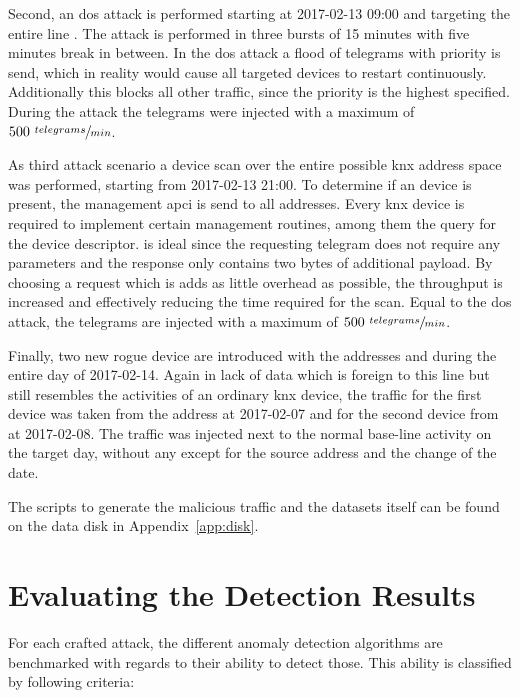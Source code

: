 Second, an \gls{dos} attack is performed starting at 2017-02-13 09:00 and targeting the entire line . The attack is performed in three bursts of 15 minutes with five minutes break in between. In the \gls{dos} attack a flood of  telegrams with  priority is send, which in reality would cause all targeted devices to restart continuously. Additionally this blocks all other traffic, since the  priority is the highest specified. During the attack the telegrams were injected with a maximum of \(500 \ \sfrac{telegrams}{min}\).

As third attack scenario a device scan over the entire possible \gls{knx} address space was performed, starting from 2017-02-13 21:00.
To determine if an device is present, the management \gls{apci}\break{} is send to all addresses. Every \gls{knx} device is required to implement certain management routines, among them the query for the device descriptor.  is ideal since the requesting telegram does not require any parameters and the response only contains two bytes of additional payload. By choosing a request which is adds as little overhead as possible, the throughput is increased and effectively reducing the time required for the scan. \parencite[cf.][p.~46]{DIN_EN_50090-4-1}
Equal to the \gls{dos} attack, the telegrams are injected with a maximum of \(500 \ \sfrac{telegrams}{min}\).

Finally, two new rogue device are introduced with the addresses  and  during the entire day of 2017-02-14.
Again in lack of data which is foreign to this line but still resembles the activities of an ordinary \gls{knx} device, the traffic for the first device was taken from the address  at 2017-02-07 and for the second device from  at 2017-02-08.
The traffic was injected next to the normal base-line activity on the target day, without any except for the source address and the change of the date.

The scripts to generate the malicious traffic and the datasets itself can be found on the data disk in Appendix~\ref{app:disk}.

\section{Evaluating the Detection Results}
\label{sec:methods:eval}

For each crafted attack, the different anomaly detection algorithms are benchmarked with regards to their ability to detect those.
This ability is classified by following criteria:

